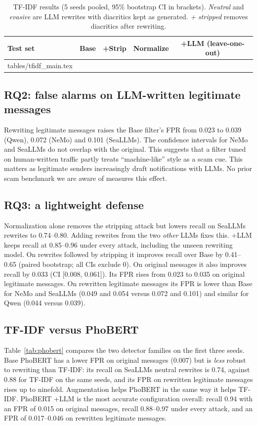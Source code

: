 \documentclass[11pt,a4paper]{article}
\begin{document}
\begin{table}[t]
\centering
\caption{TF-IDF results (5 seeds pooled, 95\% bootstrap CI in brackets). \emph{Neutral} and \emph{evasive} are LLM rewrites with diacritics kept as generated. \emph{+ stripped} removes diacritics after rewriting.}
\label{tab:main}
\small
\begin{tabular}{lcccc}
\toprule
Test set & Base & +Strip & Normalize & +LLM (leave-one-out) \\
\midrule
{} tables/tfidf_main.tex
\bottomrule
\end{tabular}
\end{table}

\subsection{RQ2: false alarms on LLM-written legitimate messages}
Rewriting legitimate messages raises the Base filter's FPR from 0.023 to 0.039 (Qwen), 0.072 (NeMo) and 0.101 (SeaLLMs). The confidence intervals for NeMo and SeaLLMs do not overlap with the original. This suggests that a filter tuned on human-written traffic partly treats ``machine-like'' style as a scam cue. This matters as legitimate senders increasingly draft notifications with LLMs. No prior scam benchmark we are aware of measures this effect.

\subsection{RQ3: a lightweight defense}
Normalization alone removes the stripping attack but lowers recall on SeaLLMs rewrites to 0.74--0.80. Adding rewrites from the two \emph{other} LLMs fixes this. +LLM keeps recall at 0.85--0.96 under every attack, including the unseen rewriting model. On rewrites followed by stripping it improves recall over Base by 0.41--0.65 (paired bootstrap; all CIs exclude 0). On original messages it also improves recall by 0.033 (CI [0.008, 0.061]). Its FPR rises from 0.023 to 0.035 on original legitimate messages. On rewritten legitimate messages its FPR is lower than Base for NeMo and SeaLLMs (0.049 and 0.054 versus 0.072 and 0.101) and similar for Qwen (0.044 versus 0.039).

\subsection{TF-IDF versus PhoBERT}
Table~\ref{tab:phobert} compares the two detector families on the first three seeds. Base PhoBERT has a lower FPR on original messages (0.007) but is \emph{less} robust to rewriting than TF-IDF: its recall on SeaLLMs neutral rewrites is 0.74, against 0.88 for TF-IDF on the same seeds, and its FPR on rewritten legitimate messages rises up to ninefold. Augmentation helps PhoBERT in the same way it helps TF-IDF. PhoBERT +LLM is the most accurate configuration overall: recall 0.94 with an FPR of 0.015 on original messages, recall 0.88--0.97 under every attack, and an FPR of 0.017--0.046 on rewritten legitimate messages.
\end{document}
